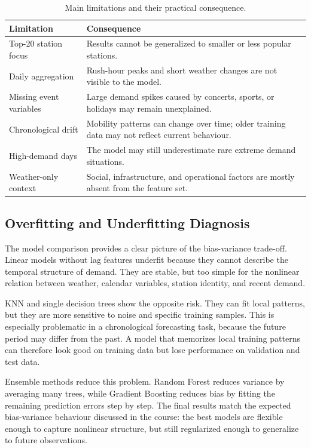 \begin{table}[htbp]
\caption{Main limitations and their practical consequence.}
\label{tab:limitations}
\centering
\scriptsize
\begin{tabularx}{\columnwidth}{p{} X}
\toprule
\textbf{Limitation} & \textbf{Consequence} \\
\midrule
Top-20 station focus & 
Results cannot be generalized to smaller or less popular stations. \\
\addlinespace
Daily aggregation & 
Rush-hour peaks and short weather changes are not visible to the model. \\
\addlinespace
Missing event variables & 
Large demand spikes caused by concerts, sports, or holidays may 
remain unexplained. \\
\addlinespace
Chronological drift & 
Mobility patterns can change over time; older training data may 
not reflect current behaviour. \\
\addlinespace
High-demand days & 
The model may still underestimate rare extreme demand situations. \\
\addlinespace
Weather-only context & 
Social, infrastructure, and operational factors are mostly absent 
from the feature set. \\
\bottomrule
\end{tabularx}
\end{table}

\subsection{Overfitting and Underfitting Diagnosis}

The model comparison provides a clear picture of the bias-variance 
trade-off. Linear models without lag features underfit because they 
cannot describe the temporal structure of demand. They are stable, but 
too simple for the nonlinear relation between weather, calendar 
variables, station identity, and recent demand.

KNN and single decision trees show the opposite risk. They can fit 
local patterns, but they are more sensitive to noise and specific 
training samples. This is especially problematic in a chronological 
forecasting task, because the future period may differ from the past. 
A model that memorizes local training patterns can therefore look good 
on training data but lose performance on validation and test data.

Ensemble methods reduce this problem. Random Forest reduces variance 
by averaging many trees, while Gradient Boosting reduces bias by 
fitting the remaining prediction errors step by step. The final results 
match the expected bias-variance behaviour discussed in the course: 
the best models are flexible enough to capture nonlinear structure, 
but still regularized enough to generalize to future observations.

